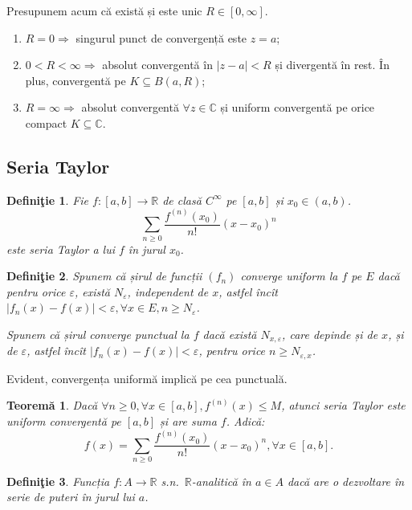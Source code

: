 \documentclass[11pt,a4paper]{article}
\newcommand\seq{\subseteq}
\newcommand\RR{\mathbb{R}}
\newcommand\CC{\mathbb{C}}
\theoremstyle{dotless}
\newtheorem{theorem}{Teorem\u{a}}[section]
\theoremstyle{dotlessdr}
\newtheorem{definition}{Defini\c{t}ie}[section]
\begin{document}
Presupunem acum că există și este unic $R \in [0, \infty]$.
\begin{enumerate}
  \item $R = 0 \Rightarrow$ singurul punct de convergență este $z = a$;
  \item $0 < R < \infty \Rightarrow$ absolut convergentă în $|z - a| < R$ și
    divergentă în rest. În plus, convergentă pe $K \seq B(a, R)$;
  \item $R = \infty \Rightarrow$ absolut convergentă $\forall z \in \CC$ și
    uniform convergentă pe orice compact $K \seq \CC$.
\end{enumerate}


\subsection{Seria Taylor}

\begin{definition}\label{def:seria-taylor}
  Fie $f : [a, b] \to \RR$ de clasă $C^\infty$ pe $[a, b]$ și $x_0 \in (a, b)$.
  \[
    \sum_{n \geq 0} \frac{f^{(n)}(x_0)}{n!}(x - x_0)^n
  \]
  este \emph{seria Taylor a lui $f$ în jurul $x_0$}.
\end{definition}

\begin{definition}\label{def:conv-unif-punct}
  Spunem că șirul de funcții $(f_n)$ \emph{converge uniform} la $f$ pe $E$ dacă
  pentru orice $\varepsilon$, există $N_\varepsilon$, independent de $x$, astfel
  încît $|f_n(x) - f(x)| < \varepsilon, \forall x \in E, n \geq N_\varepsilon$.

  Spunem că șirul \emph{converge punctual} la $f$ dacă există $N_{x, \varepsilon}$,
  care depinde și de $x$, și de $\varepsilon$, astfel încît
  $|f_n(x) - f(x)| < \varepsilon$, pentru orice $n \geq N_{\varepsilon, x}$.
\end{definition}

Evident, convergența uniformă implică pe cea punctuală.


\begin{theorem}\label{thm:conditie-taylor}
  Dacă $\forall n \geq 0, \forall x \in [a, b], f^{(n)}(x) \leq M$, atunci seria
  Taylor este uniform convergentă pe $[a, b]$ și are suma $f$. Adică:
  \[
    f(x) = \sum_{n \geq 0} \frac{f^{(n)}(x_0)}{n!}(x - x_0)^n, \forall x \in [a, b].
  \]
\end{theorem}

\begin{definition}\label{def:f-analitica}
  Funcția $f : A \to \RR$ s.n.\ \emph{$\RR$-analitică} în $a \in A$ dacă are o dezvoltare
  în serie de puteri în jurul lui $a$.
\end{definition}
\end{document}
